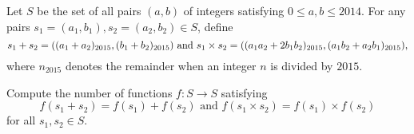 Let $S$ be the set of all pairs $(a, b)$ of integers satisfying $0 \le a, b \le 2014.$ For any pairs $s_1 = (a_1, b_1), s_2 = (a_2, b_2) \in S$, define \[s_1 + s_2 = ((a_1 + a_2)_{2015}, (b_1 + b_2)_{2015}) \\ \text { and } \\ s_1 \times s_2 = ((a_1a_2 + 2b_1b_2)_{2015}, (a_1b_2 + a_2b_1)_{2015}), \] where $n_{2015}$ denotes the remainder when an integer $n$ is divided by $2015.$

Compute the number of functions $f : S \rightarrow S$ satisfying \[ f(s_1 + s_2) = f(s_1) + f(s_2) \text{ and } f(s_1 \times s_2) = f(s_1) \times f(s_2) \] for all $s_1, s_2 \in S.$

